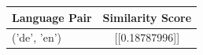 \begin{tabular}{|l|c|}
\hline
Language Pair & Similarity Score \\
\hline
('de', 'en') & [[0.18787996]] \\
\hline
\end{tabular}

